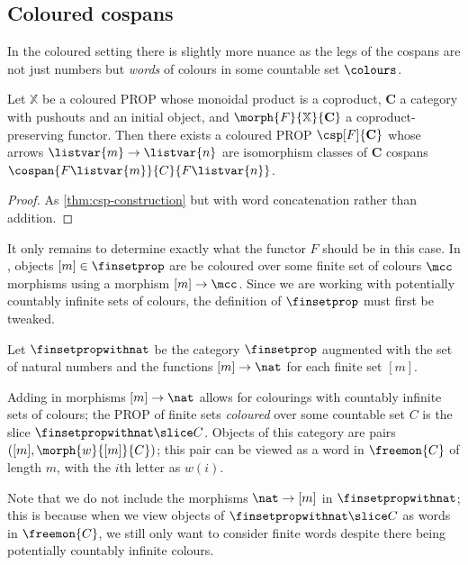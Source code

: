 \subsection{Coloured cospans}

In the coloured setting there is slightly more nuance as the legs of the
cospans are not just numbers but \emph{words} of colours in some countable set
\(\colours\).

\begin{theorem}\label{thm:coloured-csp-construction}
    Let \(\mathbb{X}\) be a coloured PROP whose monoidal product is a coproduct,
    \(\mathbf{C}\) a category with pushouts and an initial object, and \(
    \morph{F}{\mathbb{X}}{\mathbf{C}}
    \) a coproduct-preserving functor.
    Then there exists a coloured PROP \(\csp[F]{\mathbf{C}}\) whose arrows
    \(\listvar{m} \to \listvar{n}\) are isomorphism classes of \(\mathbf{C}\)
    cospans \(\cospan{F\listvar{m}}{C}{F\listvar{n}}\).
\end{theorem}
\begin{proof}
    As \cref{thm:csp-construction} but with word concatenation rather
    than addition.
\end{proof}

It only remains to determine exactly what the functor \(F\) should be in this
case.
In \cite{bonchi2022string}, objects \([m] \in \finsetprop\) are be coloured over
some finite set of colours \(\mcc\) morphisms using a morphism \([m] \to \mcc\).
Since we are working with potentially countably infinite sets of colours, the
definition of \(\finsetprop\) must first be tweaked.

\begin{definition}
    Let \(\finsetpropwithnat\) be the category \(\finsetprop\) augmented with the
    set of natural numbers and the functions \([m] \to \nat\) for each finite
    set \([m]\).
\end{definition}

Adding in morphisms \([m] \to \nat\) allows for colourings with countably
infinite sets of colours; the PROP of finite sets \emph{coloured} over some
countable set \(C\) is the slice \(\finsetpropwithnat \slice C\).
Objects of this category are pairs \(([m], \morph{w}{[m]}{C})\); this pair can
be viewed as a word in \(\freemon{C}\) of length \(m\), with the \(i\)th letter
as \(w(i)\).

\begin{remark}
    Note that we do not include the morphisms \(\nat \to [m]\) in
    \(\finsetpropwithnat\); this is because when we view objects of
    \(\finsetpropwithnat \slice C\) as words in \(\freemon{C}\), we still only
    want to consider finite words despite there being potentially countably
    infinite colours.
\end{remark}

